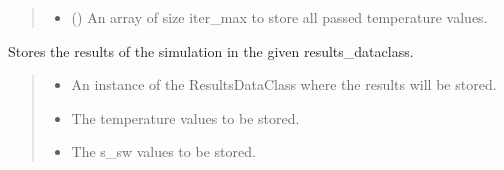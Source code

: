\documentclass[a4paper,11pt,english,openany]{sphinxmanual}
\begin{document}
\begin{fulllineitems}
\begin{fulllineitems}
\begin{quote}
\begin{description}
\begin{itemize}
\item {} 
\sphinxAtStartPar
{} () \textendash{} An array of size iter\_max to store all passed temperature values.

\end{itemize}

\end{description}\end{quote}

\end{fulllineitems}


\begin{fulllineitems}
\label{\detokenize{api/spyice.parameters.results_params:src.spyice.parameters.results_params.ResultsParams.store_results}}
\pysigstartsignatures
\pysiglinewithargsret
{}
{\sphinxparamcomma {}\sphinxparamcomma {}\sphinxparamcomma {}\sphinxparamcomma {}\sphinxparamcomma {}\sphinxparamcomma {}\sphinxparamcomma {}\sphinxparamcomma {}\sphinxparamcomma {}}
{}
\pysigstopsignatures
\sphinxAtStartPar
Stores the results of the simulation in the given results\_dataclass.
\begin{quote}\begin{description}
\begin{itemize}
\item {} 
\sphinxAtStartPar
{} \textendash{} An instance of the ResultsDataClass where the results will be stored.

\item {} 
\sphinxAtStartPar
{} \textendash{} The temperature values to be stored.

\item {} 
\sphinxAtStartPar
{} \textendash{} The s\_sw values to be stored.


\end{itemize}
\end{description}
\end{quote}
\end{fulllineitems}
\end{fulllineitems}
\end{document}
